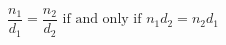 \documentclass[12pt]{article}
\begin{document}
\sicpsize
\[
\frac{n_1}{d_1} = \frac{n_2}{d_2} \text{ if and only if } n_1d_2 = n_2d_1
\]
\end{document}
